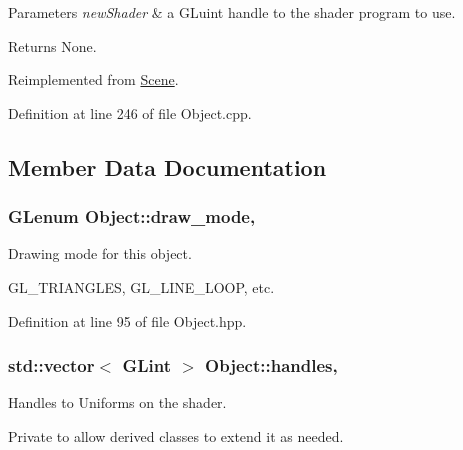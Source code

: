 \begin{DoxyParams}{Parameters}
{\em new\-Shader} & a G\-Luint handle to the shader program to use.\\
\hline
\end{DoxyParams}
\begin{DoxyReturn}{Returns}
None. 
\end{DoxyReturn}


Reimplemented from \hyperlink{class_scene_a7137a7302c21ac4dd44e746bfb6f7cf8}{Scene}.



Definition at line 246 of file Object.\-cpp.



\subsection{Member Data Documentation}
\hypertarget{class_object_a82764b385767d989f27d301ab206acb8}{
\subsubsection[{draw\-\_\-mode}]{\setlength{\rightskip}{0pt plus 5cm}G\-Lenum Object\-::draw\-\_\-mode\hspace{0.3cm}{\ttfamily [protected]}, {\ttfamily [inherited]}}}\label{class_object_a82764b385767d989f27d301ab206acb8}


Drawing mode for this object. 

G\-L\-\_\-\-T\-R\-I\-A\-N\-G\-L\-E\-S, G\-L\-\_\-\-L\-I\-N\-E\-\_\-\-L\-O\-O\-P, etc. 

Definition at line 95 of file Object.\-hpp.

\hypertarget{class_object_acd6c7021617ea334915a1525f9519bc5}{
\subsubsection[{handles}]{\setlength{\rightskip}{0pt plus 5cm}std\-::vector$<$ G\-Lint $>$ Object\-::handles\hspace{0.3cm}{\ttfamily [protected]}, {\ttfamily [inherited]}}}\label{class_object_acd6c7021617ea334915a1525f9519bc5}


Handles to Uniforms on the shader. 

Private to allow derived classes to extend it as needed. 

